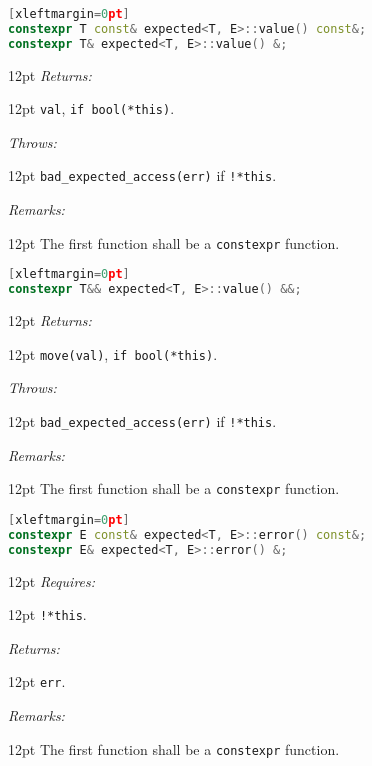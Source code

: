 \documentclass[a4paper,10pt]{article}
\newcommand{\cpp}[1]{\lstinline{#1}}
\newcommand{\wordingItem}[1]{\noindent\textit{#1:}}
\newenvironment{wordingTextItem}[1]{\wordingItem{#1}\vspace{2pt}\noindent\begin{adjustwidth}{12pt}{}}{\vspace{2pt}\end{adjustwidth}}
\newenvironment{wordingPara}{\begin{adjustwidth}{12pt}{}}{\end{adjustwidth}}
\begin{document}
\begin{lstlisting}[language=C++][xleftmargin=0pt]
constexpr T const& expected<T, E>::value() const&;
constexpr T& expected<T, E>::value() &;
\end{lstlisting}
\begin{wordingPara}
\begin{wordingTextItem}{Returns}
\cpp{val}, \cpp{if bool(*this)}.
\end{wordingTextItem}
\begin{wordingTextItem}{Throws}
\cpp{bad_expected_access(err)} if \cpp{!*this}.
\end{wordingTextItem}
\begin{wordingTextItem}{Remarks}
The first function shall be a \cpp{constexpr} function.
\end{wordingTextItem}
\end{wordingPara}

\begin{lstlisting}[language=C++][xleftmargin=0pt]
constexpr T&& expected<T, E>::value() &&;
\end{lstlisting}
\begin{wordingPara}
\begin{wordingTextItem}{Returns}
\cpp{move(val)}, \cpp{if bool(*this)}.
\end{wordingTextItem}
\begin{wordingTextItem}{Throws}
\cpp{bad_expected_access(err)} if \cpp{!*this}.
\end{wordingTextItem}
\begin{wordingTextItem}{Remarks}
The first function shall be a \cpp{constexpr} function.
\end{wordingTextItem}
\end{wordingPara}

\begin{lstlisting}[language=C++][xleftmargin=0pt]
constexpr E const& expected<T, E>::error() const&;
constexpr E& expected<T, E>::error() &; 
\end{lstlisting}
\begin{wordingPara}
\begin{wordingTextItem}{Requires}
\cpp{!*this}.
\end{wordingTextItem}
\begin{wordingTextItem}{Returns}
\cpp{err}.
\end{wordingTextItem}
\begin{wordingTextItem}{Remarks}
The first function shall be a \cpp{constexpr} function.
\end{wordingTextItem}
\end{wordingPara}
\end{document}
